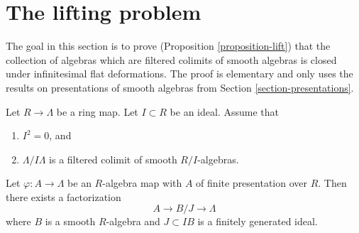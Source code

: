 \section{The lifting problem}
\label{section-lifting}

\noindent
The goal in this section is to prove (Proposition \ref{proposition-lift})
that the collection of algebras which are filtered colimits of smooth algebras
is closed under infinitesimal flat deformations. The proof is elementary
and only uses the results on presentations of smooth algebras from
Section \ref{section-presentations}.

\begin{lemma}
\label{lemma-lift-once}
Let $R \to \Lambda$ be a ring map. Let $I \subset R$ be an ideal.
Assume that
\begin{enumerate}
\item $I^2 = 0$, and
\item $\Lambda/I\Lambda$ is a filtered colimit of smooth $R/I$-algebras.
\end{enumerate}
Let $\varphi : A \to \Lambda$ be an $R$-algebra map with $A$ of finite
presentation over $R$. Then there exists a factorization
$$
A \to B/J \to \Lambda
$$
where $B$ is a smooth $R$-algebra and $J \subset IB$ is a finitely generated
ideal.
\end{lemma}

